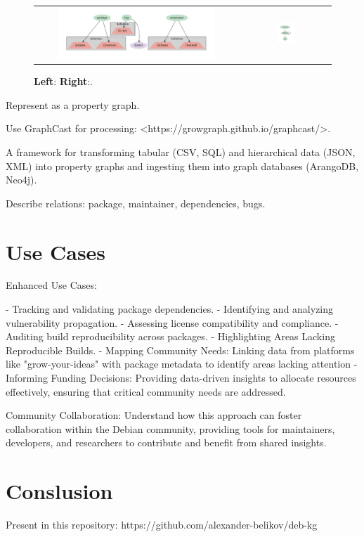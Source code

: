 \documentclass[11pt,oneside,a4paper]{article}
\begin{document}
    \begin{figure}[h]
        \centering
        \begin{tabular}{cc}
            \includegraphics[width=0.8\textwidth]{../figs/debian-eco-vc2fields} &
            \includegraphics[width=0.2\textwidth]{../figs/debian-eco-vc2vc} \\
        \end{tabular}
        \caption{\textbf{Left}: \textbf{Right}:.}\label{fig:schema}
    \end{figure}


    Represent as a property graph.

    Use GraphCast for processing: <https://growgraph.github.io/graphcast/>.

    A framework for transforming tabular (CSV, SQL) and hierarchical data (JSON, XML) into property graphs and ingesting them into graph databases (ArangoDB, Neo4j).

    Describe relations: package, maintainer, dependencies, bugs.


    \section{Use Cases}

    Enhanced Use Cases:

    - Tracking and validating package dependencies.
    - Identifying and analyzing vulnerability propagation.
    - Assessing license compatibility and compliance.
    - Auditing build reproducibility across packages.
    - Highlighting Areas Lacking Reproducible Builds.
    - Mapping Community Needs: Linking data from platforms like "grow-your-ideas" with package metadata to identify areas lacking attention
    - Informing Funding Decisions: Providing data-driven insights to allocate resources effectively, ensuring that critical community needs are addressed.

    Community Collaboration: Understand how this approach can foster collaboration within the Debian community, providing tools for maintainers, developers, and researchers to contribute and benefit from shared insights.


    \section{Conslusion}


    Present in this repository:
    https://github.com/alexander-belikov/deb-kg

    
    
\end{document}
